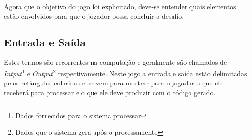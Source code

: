 Agora que o objetivo do jogo foi explicitado, deve-se entender quais elementos 
estão envolvidos para que o jogador possa concluir o desafio.

\subsection{Entrada e Saída}

Estes termos são recorrentes na computação e geralmente são chamados de
\textit{Intput}\footnote{Dados fornecidos para o sistema processar} e 
\textit{Output}\footnote{Dados que o sistema gera após o processamento} 
respectivamente. Neste jogo a entrada e saída
estão delimitadas pelos retângulos coloridos e servem para mostrar para o 
jogador o que ele receberá para processar e o que ele deve produzir com o código
gerado.

